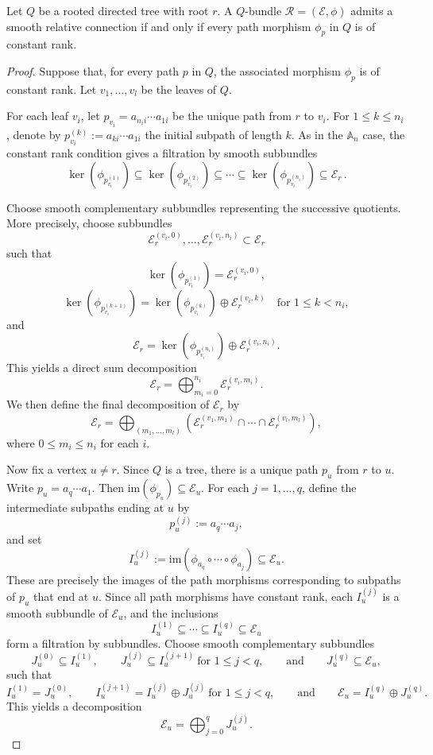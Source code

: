 \documentclass[10pt,a4paper]{amsart}
\newcommand{\im}{\mathrm{im}}
\begin{document}
\begin{proposition}\label{tree}
Let $Q$ be a rooted directed tree with root $r$. A $Q$-bundle $\mathcal{R} = (\mathcal{E}, \phi)$ admits a smooth relative connection if and only if every path morphism $\phi_p$ in $Q$ is of constant rank.
\end{proposition}

\begin{proof}
Suppose that, for every path $p$ in $Q$, the associated morphism $\phi_p$ is of constant rank. Let $v_1, \dots, v_l$ be the leaves of $Q$. 

For each leaf $v_i$, let $p_{v_i} = a_{n_i i} \cdots a_{1 i}$
be the unique path from $r$ to $v_i$. 
For $1 \le k \le n_i$, denote by
$p_{v_i}^{(k)} := a_{k i} \cdots  a_{1 i}$
the initial subpath of length $k$.
As in the $\mathbb{A}_n$ case, the constant rank condition gives a filtration by smooth subbundles
\[
\ker(\phi_{p_{v_i}^{(1)}})
\subseteq
\ker(\phi_{p_{v_i}^{(2)}})
\subseteq
\cdots
\subseteq
\ker(\phi_{p_{v_i}^{(n_i)}}) \subseteq
\mathcal{E}_r\,.
\]

Choose smooth complementary subbundles representing the successive quotients. 
More precisely, choose subbundles
\[
\mathcal{E}_r^{(v_i,0)}, \dots, \mathcal{E}_r^{(v_i,n_i)} \subset \mathcal{E}_r
\]
such that
\[
\ker(\phi_{p_{v_i}^{(1)}}) = \mathcal{E}_r^{(v_i,0)},
\]
\[
\ker(\phi_{p_{v_i}^{(k+1)}})
=
\ker(\phi_{p_{v_i}^{(k)}})
\oplus
\mathcal{E}_r^{(v_i,k)}
\quad \text{for } 1 \le k < n_i,
\]
and
\[
\mathcal{E}_r
=
\ker(\phi_{p_{v_i}^{(n_i)}})
\oplus
\mathcal{E}_r^{(v_i,n_i)}.
\]
This yields a direct sum decomposition
\[
\mathcal{E}_r
=
\bigoplus_{m_i=0}^{n_i}
\mathcal{E}_r^{(v_i,m_i)}.
\]
We then define the final decomposition of $\mathcal{E}_r$ by
\[
\mathcal{E}_r
=
\bigoplus_{(m_1,\dots,m_l)}
\left(
\mathcal{E}_r^{(v_1,m_1)}
\cap
\cdots
\cap
\mathcal{E}_r^{(v_l,m_l)}
\right),
\]
where $0 \le m_i \le n_i$ for each $i$.

Now fix a vertex $u \neq r$. Since $Q$ is a tree, there is a unique path $p_u$ from $r$ to $u$. Write
$p_u = a_q \cdots a_1.$
Then $\im(\phi_{p_u}) \subseteq \mathcal{E}_u$.
For each $j = 1, \dots, q$, define the intermediate subpaths ending at $u$ by
\[
p_u^{(j)} := a_q \cdots a_j,
\]
and set
\[
I_u^{(j)} := \im(\phi_{a_q} \circ \cdots \circ \phi_{a_j})
\subseteq \mathcal{E}_u.
\]
These are precisely the images of the path morphisms corresponding to subpaths of $p_u$ that end at $u$. Since all path morphisms have constant rank, each $I_u^{(j)}$ is a smooth subbundle of $\mathcal{E}_u$, and the inclusions
\[
I_u^{(1)} \subseteq \cdots \subseteq I_u^{(q)} \subseteq \mathcal{E}_u
\]
form a filtration by subbundles. Choose smooth complementary subbundles
\[
J_u^{(0)} \subseteq I_u^{(1)}, \qquad
J_u^{(j)} \subseteq I_u^{(j+1)} \ \text{for } 1 \le j < q, \qquad \text{and} \qquad J_u^{(q)} \subseteq \mathcal{E}_u,
\]
such that
\[
I_u^{(1)} = J_u^{(0)}, \qquad
I_u^{(j+1)} = I_u^{(j)} \oplus J_u^{(j)} \ \text{for } 1 \le j < q, \qquad \text{and} \qquad
\mathcal{E}_u = I_u^{(q)} \oplus J_u^{(q)}.
\]
This yields a decomposition
\[
\mathcal{E}_u
=
\bigoplus_{j=0}^{q}
J_u^{(j)}.
\]



\end{proof}
\end{document}
